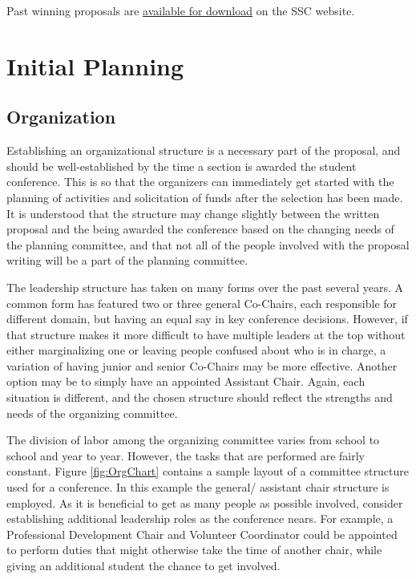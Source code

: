\documentclass[12pt]{article}
\begin{document}
Past winning proposals are \href{http://students.ans.org/student-conferences/}{available for download} on the SSC website.

\clearpage
\section{Initial Planning}

\subsection{Organization}
Establishing an organizational structure is a necessary part of the proposal, and should be well-established by the time a section is awarded the student conference.
This is so that the organizers can immediately get started with the planning of activities and solicitation of funds after the selection has been made.
It is understood that the structure may change slightly between the written proposal and the being awarded the conference based on the changing needs of the planning committee, and that not all of the people involved with the proposal writing will be a part of the planning committee.

The leadership structure has taken on many forms over the past several years.
A common form has featured two or three general Co-Chairs, each responsible for different domain, but having an equal say in key conference decisions.
However, if that structure makes it more difficult to have multiple leaders at the top without either marginalizing one or leaving people confused about who is in charge, a variation of having junior and senior Co-Chairs may be more effective.
Another option may be to simply have an appointed Assistant Chair.
Again, each situation is different, and the chosen structure should reflect the strengths and needs of the organizing committee.

The division of labor among the organizing committee varies from school to school and year to year.
However, the tasks that are performed are fairly constant.
Figure \ref{fig:OrgChart} contains a sample layout of a committee structure used for a conference.
In this example the general/ assistant chair structure is employed.
As it is beneficial to get as many people as possible involved, consider establishing additional leadership roles as the conference nears.
For example, a Professional Development Chair and Volunteer Coordinator could be appointed to perform duties that might otherwise take the time of another chair, while giving an additional student the chance to get involved.
\end{document}
